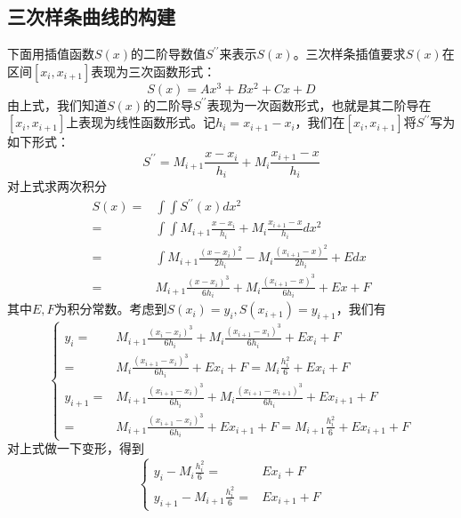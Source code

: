 \subsection{三次样条曲线的构建}
下面用插值函数$S(x)$的二阶导数值$S^{\prime\prime}$来表示$S(x)$。三次样条插值要求$S(x)$在区间$[x_i, x_{i+1}]$表现为三次函数形式：
\begin{equation*}
	S(x) = Ax^3 + Bx^2 + Cx + D
\end{equation*} 
由上式，我们知道$S(x)$的二阶导$S^{\prime\prime}$表现为一次函数形式，也就是其二阶导在$[x_i, x_{i+1}]$上表现为线性函数形式。记$h_i = x_{i+1} - x_{i}$，我们在$[x_i, x_{i+1}]$将$S^{\prime\prime}$写为如下形式：
\begin{equation}
	S^{\prime\prime} = M_{i+1} \frac{x - x_i}{h_i} + M_{i} \frac{x_{i+1} - x}{h_i}
\end{equation} 
对上式求两次积分
\begin{equation*}
	\begin{aligned}
		S(x) =& \int\int S^{\prime\prime}(x) dx^2	\\
				=&	\int\int M_{i+1} \frac{x - x_i}{h_i} + M_{i} \frac{x_{i+1} - x}{h_i} dx^2	\\
				=&	\int M_{i+1} \frac{(x - x_i)^2}{2h_i} -  M_{i} \frac{(x_{i+1} - x)^2}{2h_i} + E dx	\\
				=&	M_{i+1} \frac{(x - x_i)^3}{6h_i} +  M_{i} \frac{(x_{i+1} - x)^3}{6h_i} + Ex + F 
	\end{aligned}
\end{equation*} 
其中$E, F$为积分常数。考虑到$S(x_i) = y_i, S(x_{i+1}) = y_{i+1}$，我们有
\begin{equation*}
	\left\{
		\begin{aligned}
			y_i =& M_{i+1} \frac{(x_{i} - x_i)^3}{6h_i} +  M_{i} \frac{(x_{i+1} - x_i)^3}{6h_i} + Ex_i + F  \\
				=& M_{i} \frac{(x_{i+1} - x_i)^3}{6h_i} + Ex_i + F = M_{i} \frac{h_i^2}{6} + Ex_i + F   \\ 
			y_{i+1} =& M_{i+1}\frac{(x_{i+1}-x_i)^3}{6h_i}+M_{i}\frac{(x_{i+1}-x_{i+1})^3}{6h_i}+Ex_{i+1}+F  \\
					=& M_{i+1} \frac{(x_{i+1} - x_i)^3}{6h_i} + Ex_{i+1} + F = M_{i+1} \frac{h_i^2}{6} + Ex_{i+1} + F   
		\end{aligned}
	\right.
\end{equation*} 
对上式做一下变形，得到
\begin{equation*}
	\left\{ 
		\begin{aligned}
			y_i - M_{i} \frac{h_i^2}{6} =&  Ex_i + F   \\ 
			y_{i+1} - M_{i+1} \frac{h_i^2}{6} = & Ex_{i+1} + F   
		\end{aligned}
	\right.
\end{equation*} 
